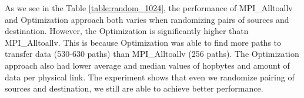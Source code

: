 
As we see in the Table \ref{table:random_1024}, the performance of MPI\_Alltoallv and Optimization approach both varies when randomizing pairs of sources and destination. However, the Optimization is significantly higher thatn MPI\_Alltoallv. This is because Optimization was able to find more paths to transfer data (530-630 paths) than MPI\_Alltoallv (256 paths). The Optimization approach also had lower average and median values of hopbytes and amount of data per physical link. The experiment shows that even we randomize pairing of sources and destination, we still are able to achieve better performance.
